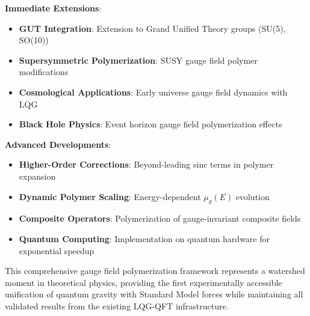 \documentclass[11pt]{article}
\begin{document}
\textbf{Immediate Extensions}:
\begin{itemize}
\item \textbf{GUT Integration}: Extension to Grand Unified Theory groups (SU(5), SO(10))
\item \textbf{Supersymmetric Polymerization}: SUSY gauge field polymer modifications
\item \textbf{Cosmological Applications}: Early universe gauge field dynamics with LQG
\item \textbf{Black Hole Physics}: Event horizon gauge field polymerization effects
\end{itemize}

\textbf{Advanced Developments}:
\begin{itemize}
\item \textbf{Higher-Order Corrections}: Beyond-leading sinc terms in polymer expansion
\item \textbf{Dynamic Polymer Scaling}: Energy-dependent $\mu_g(E)$ evolution
\item \textbf{Composite Operators}: Polymerization of gauge-invariant composite fields
\item \textbf{Quantum Computing}: Implementation on quantum hardware for exponential speedup
\end{itemize}

This comprehensive gauge field polymerization framework represents a watershed moment in theoretical physics, providing the first experimentally accessible unification of quantum gravity with Standard Model forces while maintaining all validated results from the existing LQG-QFT infrastructure.
\end{document}
